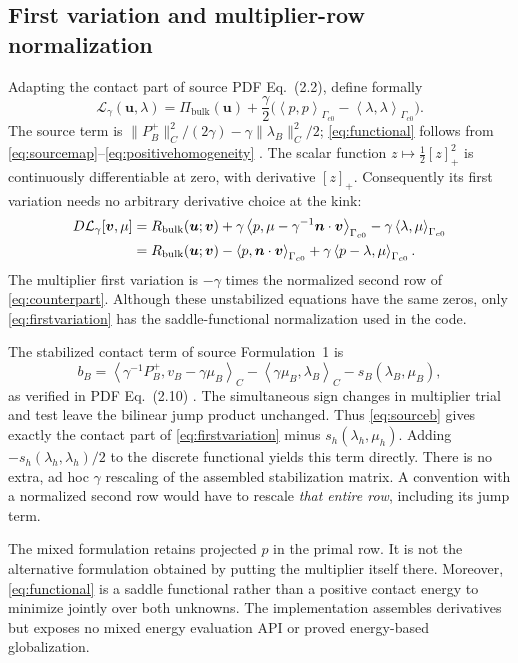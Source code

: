 \documentclass[preprint,11pt]{elsarticle}
\numberwithin{equation}{section}
\newcommand{\bu}{\boldsymbol{u}}
\newcommand{\bv}{\boldsymbol{v}}
\newcommand{\bn}{\boldsymbol{n}}
\newcommand{\Gc}{\Gamma_{c0}}
\newcommand{\ip}[2]{\left\langle #1,#2\right\rangle_{\Gc}}
\newcommand{\pos}[1]{\left[#1\right]_+}
\newcommand{\Rbulk}{R_{\mathrm{bulk}}}
\newcommand{\Pibulk}{\Pi_{\mathrm{bulk}}}
\begin{document}
\subsection{First variation and multiplier-row normalization}
Adapting the contact part of source PDF Eq.~(2.2), define formally
\begin{equation}
 \mathcal{L}_\gamma(\bu,\lambda)=\Pibulk(\bu)
       +\frac\gamma2\bigl(\ip{p}{p}-\ip{\lambda}{\lambda}\bigr).
 \label{eq:functional}
\end{equation}
The source term is $\|P_B^+\|_C^2/(2\gamma)
-\gamma\|\lambda_B\|_C^2/2$; \eqref{eq:functional} follows from
\eqref{eq:sourcemap}--\eqref{eq:positivehomogeneity}
\cite[Section 2, PDF Eq.~(2.2)]{BHLv1}.
The scalar function $z\mapsto\tfrac12\pos{z}^2$ is continuously
differentiable at zero, with derivative $\pos{z}$. Consequently its first
variation needs no arbitrary derivative choice at the kink:
\begin{align}
 D\mathcal{L}_\gamma[\bv,\mu]
 &=\Rbulk(\bu;\bv)
   +\gamma\ip{p}{\mu-\gamma^{-1}\bn\cdot\bv}
   -\gamma\ip{\lambda}{\mu}\notag\\
 &=\Rbulk(\bu;\bv)-\ip{p}{\bn\cdot\bv}
                 +\gamma\ip{p-\lambda}{\mu}.
 \label{eq:firstvariation}
\end{align}
The multiplier first variation is $-\gamma$ times the normalized second
row of \eqref{eq:counterpart}. Although these unstabilized equations have
the same zeros, only \eqref{eq:firstvariation} has the saddle-functional
normalization used in the code.

The stabilized contact term of source Formulation~1 is
\begin{equation}
 b_B=\left\langle\gamma^{-1}P_B^+,v_B-\gamma\mu_B\right\rangle_C
       -\left\langle\gamma\mu_B,\lambda_B\right\rangle_C
       -s_B(\lambda_B,\mu_B),
 \label{eq:sourceb}
\end{equation}
as verified in PDF Eq.~(2.10) \cite{BHLv1}. The simultaneous sign changes
in multiplier trial and test leave the bilinear jump product unchanged.
Thus \eqref{eq:sourceb} gives exactly the contact part of
\eqref{eq:firstvariation} minus $s_h(\lambda_h,\mu_h)$.
Adding $-s_h(\lambda_h,\lambda_h)/2$ to the discrete functional yields
this term directly. There is no extra, ad hoc $\gamma$ rescaling of the
assembled stabilization matrix. A convention with a normalized second
row would have to rescale \emph{that entire row}, including its jump term.

The mixed formulation retains projected $p$ in the primal row. It is not
the alternative formulation obtained by putting the multiplier itself
there. Moreover, \eqref{eq:functional} is a saddle functional rather than
a positive contact energy to minimize jointly over both unknowns.
The implementation assembles derivatives but exposes no mixed energy
evaluation API or proved energy-based globalization.
\end{document}
